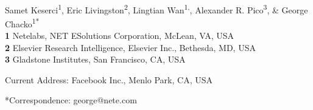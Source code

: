 \documentclass[10pt,letterpaper]{article}
\date{}
\begin{document}
\vspace*{0.2in}

\begin{flushleft}
{\Large
\textbf{} %
}
\newline
\\
Samet Keserci\textsuperscript{1},
Eric Livingston\textsuperscript{2},
Lingtian Wan\textsuperscript{1,\textcurrency},
Alexander R. Pico\textsuperscript{3},
 \& George Chacko\textsuperscript{1*}
\\
\bigskip
\textbf{1} Netelabs, NET ESolutions Corporation, McLean, VA, USA
\\
\textbf{2} Elsevier Research Intelligence, Elsevier Inc., Bethesda, MD, USA
\\
\textbf{3} Gladstone Institutes, San Francisco, CA, USA
\\
\bigskip


% 
%


\textcurrency Current Address: Facebook Inc., Menlo Park, CA, USA %



*Correspondence: george@nete.com
\end{flushleft}
\end{document}

